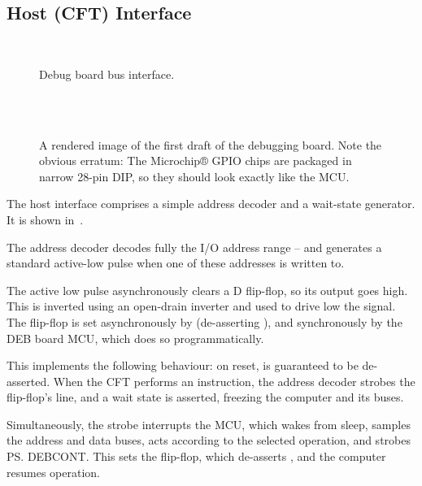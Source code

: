 \subsection{Host (CFT) Interface}

\begin{figure}
\centering
{}\\
\caption{\label{fig-deb-bus-interface}Debug board bus interface.}
\end{figure}

\begin{figure}
\centering
{}\vspace{1em}\\

\\
\caption{\label{fig-deb-board}A rendered image of the first draft of
  the debugging board. Note the obvious erratum: The Microchip®
  \gls{GPIO} chips are packaged in narrow 28-pin DIP, so they should
  look exactly like the \gls{MCU}.}
\end{figure}

The host interface comprises a simple address decoder and a wait-state
generator. It is shown in~.

The address decoder decodes fully the I/O address range
– and generates a standard active-low pulse when
one of these addresses is written to.

The active low pulse asynchronously clears a D flip-flop, so its
 output goes high. This is inverted using an open-drain inverter
and used to drive low the  signal. The flip-flop is set
asynchronously by  (de-asserting ), and synchronously
by the DEB board \gls{MCU}, which does so programmatically.

This implements the following behaviour: on reset,  is
guaranteed to be de-asserted. When the CFT performs an 
instruction, the address decoder strobes the flip-flop's 
line, and a wait state is asserted, freezing the computer and its buses.

Simultaneously, the strobe interrupts the \gls{MCU}, which wakes from
sleep, samples the address and data buses, acts according to the
selected operation, and strobes \ps{DEBCONT}. This sets the flip-flop,
which de-asserts , and the computer resumes operation.

